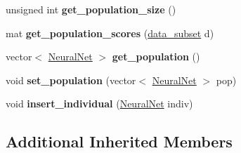 \begin{DoxyCompactItemize}
\item 
\hypertarget{classEvolutionary__trainer_ace69491101081a9efad446900975a32c}{unsigned int {\bfseries get\-\_\-population\-\_\-size} ()}\label{classEvolutionary__trainer_ace69491101081a9efad446900975a32c}

\item 
\hypertarget{classEvolutionary__trainer_ae6e1cc7504247c515efb79f483d11cb5}{mat {\bfseries get\-\_\-population\-\_\-scores} (\hyperlink{structdata__subset}{data\-\_\-subset} d)}\label{classEvolutionary__trainer_ae6e1cc7504247c515efb79f483d11cb5}

\item 
\hypertarget{classEvolutionary__trainer_a87eacfa4ce8c6482b4c7b86529e00caa}{vector$<$ \hyperlink{classNeuralNet}{Neural\-Net} $>$ {\bfseries get\-\_\-population} ()}\label{classEvolutionary__trainer_a87eacfa4ce8c6482b4c7b86529e00caa}

\item 
\hypertarget{classEvolutionary__trainer_ad0778d747295796e9c4f82a1bb20ca70}{void {\bfseries set\-\_\-population} (vector$<$ \hyperlink{classNeuralNet}{Neural\-Net} $>$ pop)}\label{classEvolutionary__trainer_ad0778d747295796e9c4f82a1bb20ca70}

\item 
\hypertarget{classEvolutionary__trainer_abd389f2edff316fe4acd0a29b10156ec}{void {\bfseries insert\-\_\-individual} (\hyperlink{classNeuralNet}{Neural\-Net} indiv)}\label{classEvolutionary__trainer_abd389f2edff316fe4acd0a29b10156ec}

\end{DoxyCompactItemize}
\subsection*{Additional Inherited Members}


